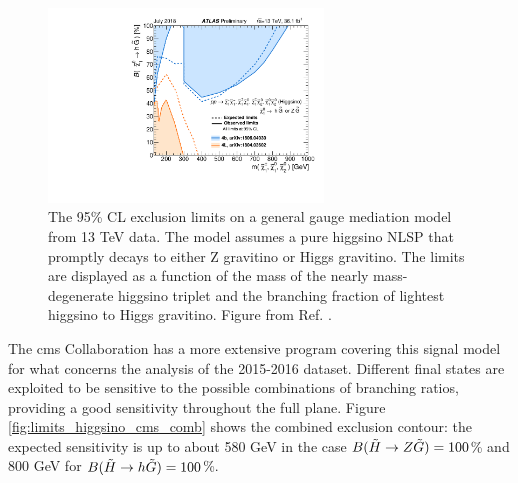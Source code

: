 \begin{figure}[htbp]
	\centering
	\includegraphics[width=0.65\textwidth]{figures/summary_plots/ATLAS_SUSY_EWSummary_GGM.pdf}
	\caption{The 95\% CL exclusion limits on a general gauge mediation model from 13 TeV data. 
	The model assumes a pure higgsino NLSP that promptly decays to either Z gravitino or Higgs gravitino. 
	The limits are displayed as a function of the mass of the nearly mass-degenerate higgsino triplet and the branching fraction of lightest higgsino to Higgs gravitino. 	Figure from Ref. \cite{atlasSUSYSummary}.
	} 
	\label{fig:summary_atlas_higgsino_GMSB}
\end{figure}

The \gls{cms} Collaboration has a more extensive program covering this signal model for what concerns the analysis of the 
2015-2016 dataset. 
Different final states are exploited to be sensitive to the possible combinations of branching ratios, 
providing a good sensitivity throughout the full plane.
Figure \ref{fig:limits_higgsino_cms_comb} shows the combined exclusion contour: the expected sensitivity is up to about 580 GeV in the case $B(\tilde{H}\rightarrow Z \tilde{G})=100$\% and 800 GeV for 
$B(\tilde{H}\rightarrow h \tilde{G})=100$\%.

